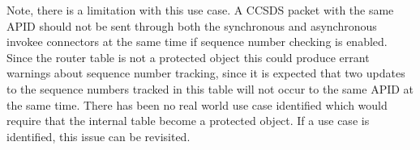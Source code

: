 Note, there is a limitation with this use case. A CCSDS packet with the same APID should not be sent through both the synchronous and asynchronous invokee connectors at the same time if sequence number checking is enabled. Since the router table is not a protected object this could produce errant warnings about sequence number tracking, since it is expected that two updates to the sequence numbers tracked in this table will not occur to the same APID at the same time. There has been no real world use case identified which would require that the internal table become a protected object. If a use case is identified, this issue can be revisited.
